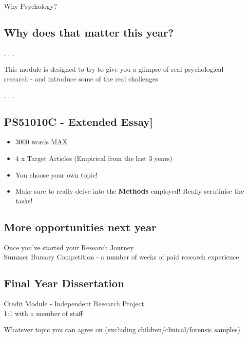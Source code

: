\documentclass[
  letterpaper,
  DIV=11,
  numbers=noendperiod]{scrartcl}
\begin{document}
\hfill\break
Why Psychology?

\hypertarget{why-does-that-matter-this-year}{%
\subsection{Why does that matter this
year?}\label{why-does-that-matter-this-year}}

. . .

\hfill\break
This module is designed to try to give you a glimpse of real
psychological research - and introduce some of the real challenges

. . .

\hypertarget{ps51010c---extended-essay}{%
\subsection{PS51010C - Extended
Essay{]}}\label{ps51010c---extended-essay}}

\begin{itemize}
\item
  {3000 words MAX}
\item
  {4 x Target Articles (Empirical from the last 3 years)}
\item
  {You choose your own topic!}
\item
  Make sure to really delve into the \textbf{Methods} employed! Really
  scrutinise the tasks!
\end{itemize}

\hypertarget{more-opportunities-next-year}{%
\subsection{More opportunities next
year}\label{more-opportunities-next-year}}

Once you've started your Research Journey\\
Summer Bursary Competition - a number of weeks of paid research
experience

\hypertarget{final-year-dissertation}{%
\subsection{Final Year Dissertation}\label{final-year-dissertation}}

\hfill{} Credit Module - Independent Research Project\\
1:1 with a member of staff

\hfill\break
Whatever topic you can agree on (excluding children/clinical/forensic
samples)
\end{document}
